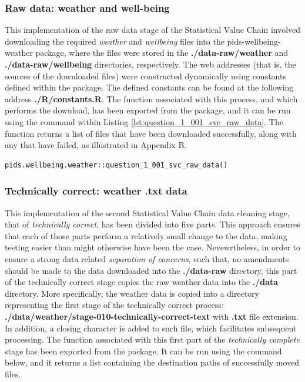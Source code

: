 \documentclass[12pt, oneside, openany]{book}
\begin{document}
\newpage
\subsubsection*{Raw data: weather and well-being}

This implementation of the raw data stage of the Statistical Value Chain involved downloading the required \emph{weather} and \emph{wellbeing} files into the pids-wellbeing-weather package, where the files were stored in the \textbf{./data-raw/weather} and \textbf{./data-raw/wellbeing} directories, respectively. The web addresses (that is, the sources of the downloaded files) were constructed dynamically using constants defined within the package. The defined constants can be found at the following address \textbf{./R/constants.R}. The function associated with this process, and which performs the download, has been exported from the  package, and it can be run using the command within Listing \ref{lst:question_1_001_svc_raw_data}. The function returns a list of files that have been downloaded successfully, along with any that have failed, as illustrated in Appendix B. 

\bigskip
\begin{lstlisting}[caption=Command to download the raw data for question 1., label={lst:question_1_001_svc_raw_data}]
pids.wellbeing.weather::question_1_001_svc_raw_data()
\end{lstlisting}

\subsubsection*{Technically correct: weather .txt data}

This implementation of the second Statistical Value Chain data cleaning stage, that of \emph{technically correct}, has been divided into five parts. This approach ensures that each of those parts perform a relatively small change to the data, making testing easier than might otherwise have been the case. Nevewrtheless, in order to ensure a strong data related \emph{separation of concerns}, such that, no amendments should be made to the data downloaded into the \textbf{./data-raw} directory, this part of the technically correct stage copies the raw weather data into the \textbf{./data} directory. More specifically, the weather data is copied into a directory representing the first stage of the technically correct process: \textbf{./data/weather/stage-010-technically-correct-text} with \textbf{.txt} file extension. In addition, a closing character is added to each file, which facilitates subsequent processing. The function associated with this first part of the \emph{technically complete} stage has been exported from the package. It can be run using the command below, and it returns a list containing the destination paths of successfully moved files.
\end{document}
